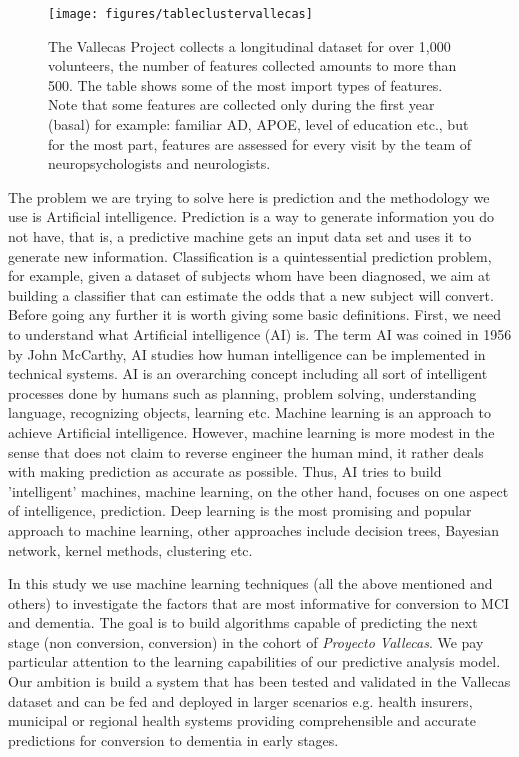 \documentclass[11pt]{article}
\theoremstyle{definition}
\theoremstyle{remark}
\begin{document}
\begin{figure}[h]
        \centering
        \texttt{[image: figures/tableclustervallecas]}
        \caption{The Vallecas Project collects a longitudinal dataset for over 1,000 volunteers, the number of features collected amounts to more than 500. The table shows some of the most import types of features. Note that some features are collected only during the first year (basal) for example: familiar AD, APOE, level of education etc., but for the most part, features are assessed for every visit by the team of neuropsychologists and neurologists.} \label{fig:tableclustervallecas}
\end{figure}

The problem we are trying to solve here is prediction and the methodology we use is Artificial intelligence. Prediction is a way to generate information you do not have, that is, a predictive machine gets an input data set and uses it to generate new information. Classification is a quintessential prediction problem, for example, given a dataset of subjects whom have been diagnosed, we aim at building a classifier that can estimate the odds that a new subject will convert. Before going any further it is worth giving some basic definitions. First, we need to understand what Artificial intelligence (AI) is. The term AI was coined in 1956 by John McCarthy, AI studies how human intelligence can be implemented in technical systems. AI is an overarching concept including all sort of intelligent processes done by humans such as planning, problem solving, understanding language, recognizing objects, learning etc. 
Machine learning is an approach to achieve Artificial intelligence. However, machine learning is more modest in the sense that does not claim to reverse engineer the human mind, it rather deals with making prediction as accurate as possible. Thus, AI tries to build 'intelligent' machines, machine learning, on the other hand, focuses on one aspect of intelligence, prediction.
Deep learning is the most promising and popular approach to machine learning, other approaches include decision trees, Bayesian network, kernel methods, clustering etc.
  
In this study we use machine learning techniques (all the above mentioned and others) to investigate the factors that are most informative for conversion to MCI and dementia. The goal is to build algorithms capable of predicting the next stage (non conversion, conversion) in the cohort of \emph{Proyecto Vallecas}. We pay particular attention to the learning capabilities of our predictive analysis model. Our ambition is build a system that has been tested and validated in the Vallecas dataset and can be fed and deployed in larger scenarios e.g. health insurers, municipal or regional health systems providing comprehensible and accurate predictions for conversion to dementia in early stages.
\end{document}
